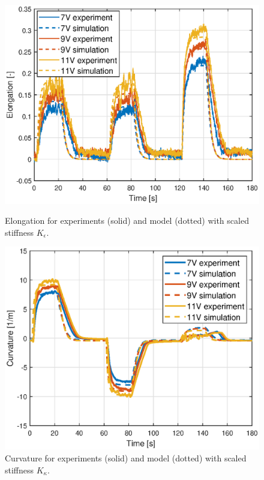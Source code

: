 \begin{figure}[H] 
    \begin{minipage}[b]{0.49\linewidth}
     \centering
    \includegraphics[width=\linewidth]{Figures/Chapter5/epsilonstiffnessver.eps} 
    \caption{Elongation for experiments (solid) and model (dotted) with scaled stiffness $K_\epsilon$. } 
    \label{fig5:elong} 
       \end{minipage} 
    \begin{minipage}[b]{0.49\linewidth}
     \centering
    \includegraphics[width=\linewidth]{Figures/Chapter5/curvaturestiffnessver.eps}
    \caption{Curvature for experiments (solid) and model (dotted) with scaled stiffness $K_\kappa$. } 
    \label{fig5:kappa} 
    \end{minipage} 
\end{figure}

